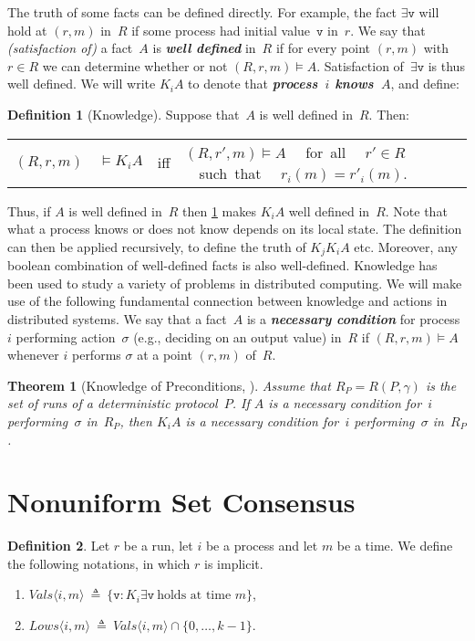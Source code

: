 \documentclass[11pt]{article}
\newtheorem{theorem}{Theorem}
\theoremstyle{definition}
\newtheorem{definition}{Definition}
\newcommand{\mv}{\mathtt{v}}
\newcommand{\existsv}{\exists{\mv}}
\newcommand{\knownvals}[1]{\ensuremath{\mathit{Vals}\node{#1}}}
\newcommand{\knownlows}[1]{\ensuremath{\mathit{Lows}\node{#1}}}
\newcommand{\eqdef}{\triangleq}
\newcommand{\set}[1]{\{#1\}}
\newcommand{\defemph}[1]{\textbf{\textit{#1}}}
\newcommand{\sat}{\models}
\newcommand{\node}[1]{\langle#1\rangle}
\begin{document}
The truth of some facts can be defined directly.
For example, the fact $\existsv$ will hold at $(r,m)$ in~$R$
if some process had initial value~$\mathtt{v}$ in~$r$. We say that {\em (satisfaction of)} a fact~$A$ is \defemph{well defined} in~$R$ if
for every point $(r,m)$ with $r\in R$ we can determine whether or not $(R,r,m)\sat A$.
Satisfaction of~$\existsv$ is thus well defined. We will write $K_iA$ to denote that \defemph{process~$i$ knows~$A$}, and define:
\begin{definition}[Knowledge]
\label{def:know}
Suppose that~$A$ is well defined in~$R$. Then:

\begin{tabular}{r l c l}
$(R,r,m)$&\hskip-3mm$\sat K_iA$ & iff & $(R,r',m)\sat A$ ~~\mbox{for all~~} $r'\in R$~~\mbox{such that~~}
$r_i(m)=r'_i(m)$.
\end{tabular}
\end{definition}

Thus, if $A$ is well defined in~$R$ then \cref{def:know} makes $K_iA$ well defined in~$R$.
Note that what a process knows or does not know depends on its local state.
The definition can then be applied recursively, to define the truth of $K_jK_iA$ etc. Moreover, any boolean combination of well-defined facts is also well-defined. Knowledge has been used to study a variety of problems in distributed computing.
We will make use of the following  fundamental connection between knowledge and actions in distributed systems. We say that a fact~$A$ is a \defemph{necessary condition} for process~$i$ performing action~$\sigma$
(e.g., deciding
on an output value)
in~$R$ if
$(R,r,m)\sat A$ whenever $i$ performs $\sigma$ at a point $(r,m)$ of~$R$.
\begin{theorem}[Knowledge of Preconditions, \cite{Moses-tark2015}]
\label{thm:knowprec}
Assume that $R_P=R(P,\gamma)$ is the set of runs of a deterministic protocol~$P$.
If $A$ is a necessary condition for~$i$ performing~$\sigma$ in~$R_P$, then $K_iA$ is a necessary condition for~$i$ performing~$\sigma$ in~$R_P$.
\end{theorem}

\section{Nonuniform Set Consensus}
\label{sec-proofs-k-set}

\begin{definition}
Let $r$ be a run,
let $i$ be a process and let $m$ be a time.
We define the following notations, in which
$r$ is implicit.
\begin{enumerate}
\item $\knownvals{i,m}~\eqdef~\{\mathtt{v}: K_i \existsv~\mbox{holds at time~$m$}\}$,
\item $\knownlows{i,m}~\eqdef~ \knownvals{i,m} \cap \set{0,\ldots,k-1}$.
\end{enumerate}
\end{definition}
\end{document}
